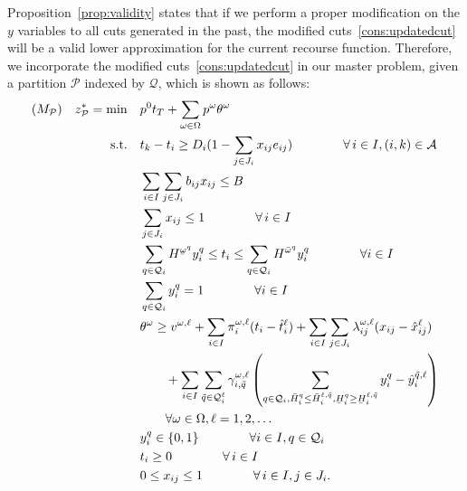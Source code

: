 \documentclass[11pt]{article}
\newcommand{\noi}{\noindent}
\renewcommand{\underbar}{\underaccent{\bar}}
\begin{document}
	\noi Proposition~\ref{prop:validity} states that if we perform a proper modification on the \(y\) variables to all cuts generated in the past, the modified cuts~\eqref{cons:updatedcut} will be a valid lower approximation for the current recourse function. Therefore, we incorporate the modified cuts~\eqref{cons:updatedcut} in our master problem, given a partition \(\mathcal{P}\) indexed by \(\mathcal{Q}\), which is shown as follows:
	\begin{subequations} \label{prob:masterTightened}
		\begin{align}
		(M_{\mathcal{P}}) \quad z_{\mathcal{P}}^* = \min \quad &p^0 t_T + \sum_{\omega \in \Omega} p^\omega \theta^{\omega}\\
		\text{s.t.} \quad & t_k - t_i \geq D_{i}(1 - \sum_{j \in J_i} x_{ij} e_{ij}) \qquad \qquad \forall \,i \in I, (i,k) \in \mathcal{A} \label{cons:MpSep}\\
		& \sum_{i \in I} \sum_{j \in J_i} b_{ij}x_{ij} \leq B  \label{cons:MpBudget}\\
		& \sum_{j \in J_i} x_{ij} \leq 1  \qquad \qquad \forall \,i \in I \label{cons:MpSingleBudget}\\
		& \sum_{q \in \mathcal{Q}_i} H^{\underbar{\omega}^q} y_i^{q} \leq t_i \leq \sum_{q \in \mathcal{Q}_i} H^{\bar{\omega}^q} y_i^{q} \qquad \qquad \forall i \in I\\
		& \sum_{q \in \mathcal{Q}_i} y^q_i = 1 \qquad \qquad \forall i \in I \label{cons:MpY1}\\
		& \theta^\omega \geq v^{\omega,\ell} + \sum_{i \in I} \pi_i^{\omega,\ell} (t_i - \hat{t}_i^{\ell}) + \sum_{i \in I} \sum_{j \in J_i} \lambda_{ij}^{\omega,\ell} (x_{ij} - \hat{x}_{ij}^{\ell}) \nonumber \\
		&\qquad + \sum_{i \in I} \sum_{\tilde{q} \in \mathcal{Q}^{\ell}_i} \gamma_{i,\tilde{q}}^{\omega,\ell} \left( \sum_{q \in \mathcal{Q}_i, \bar{H}_i^{q} \leq \bar{H}_i^{\ell,\tilde{q}},\underbar{H}_i^{q} \geq \underbar{H}_i^{\ell,\tilde{q}} }y_i^{q} - \hat{y}_i^{\tilde{q},\ell} \right) \nonumber \\
		& \qquad  \forall \omega \in \Omega, \ell = 1, 2, \dots\\
		& y_i^q \in \{0,1\} \qquad \qquad \forall i \in I, q \in \mathcal{Q}_i\\
		& t_i \geq 0 \qquad \qquad \forall \,i \in I\\
		& 0 \leq x_{ij} \leq 1 \qquad \qquad \forall \,i \in I, j \in J_i.
		\end{align}
	\end{subequations}
\end{document}
